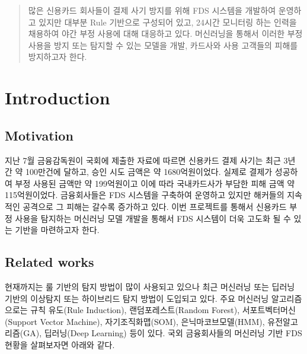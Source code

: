 \documentclass{article}
\begin{document}

\begin{abstract}
많은 신용카드 회사들이 결제 사기 방지를 위해 FDS 시스템을 개발하여 운영하고 있지만 대부분 Rule 기반으로 구성되어 있고, 24시간 모니터링 하는 인력을 채용하여 야간 부정 사용에 대해 대응하고 있다. 머신러닝을 통해서 이러한 부정 사용을 방지 또는 탐지할 수 있는 모델을 개발, 카드사와 사용 고객들의 피해를 방지하고자 한다.
\end{abstract}

\section{Introduction}
\label{submission}
\subsection{Motivation}
지난 7월 금융감독원이 국회에 제출한 자료에 따르면 신용카드 결제 사기는 최근 3년 간 약 100만건에 달하고, 승인 시도 금액은 약 1680억원이었다. 실제로 결제가 성공하여 부정 사용된 금액만 약 199억원이고 이에 따라 국내카드사가 부담한 피해 금액 약 115억원이었다. 금융회사들은 FDS 시스템을 구축하여 운영하고 있지만 해커들의 지속적인 공격으로 그 피해는 갈수록 증가하고 있다. 이번 프로젝트를 통해서 신용카드 부정 사용을 탐지하는 머신러닝 모델 개발을 통해서 FDS 시스템이 더욱 고도화 될 수 있는 기반을 마련하고자 한다.

\subsection{Related works}

현재까지는 룰 기반의 탐지 방법이 많이 사용되고 있으나 최근 머신러닝 또는 딥러닝 기반의 이상탐지 또는 하이브리드 탐지 방법이 도입되고 있다. 주요 머신러닝 알고리즘으로는 규칙 유도(Rule Induction), 랜덤포레스트(Random Forest), 서포트벡터머신(Support Vector Machine), 자기조직화맵(SOM), 은닉마코브모델(HMM), 유전알고리즘(GA), 딥러닝(Deep Learning) 등이 있다. 국외 금융회사들의 머신러닝 기반 FDS 현황을 살펴보자면 아래와 같다.
\end{document}
